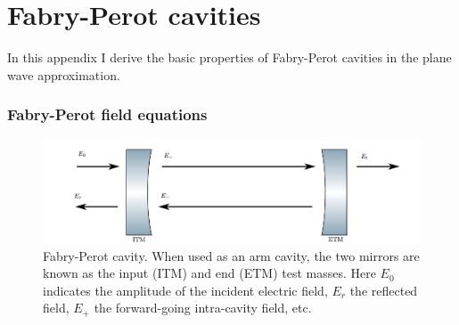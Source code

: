\chapter{Fabry-Perot cavities}
In this appendix I derive the basic properties of Fabry-Perot
cavities in the plane wave approximation.

\subsection{Fabry-Perot field equations}

\begin{figure}
\includegraphics[]{figures/cavity.pdf}
\caption[Fabry-Perot Cavity]{\label{fig:fabry-perot}Fabry-Perot
  cavity.  When used as an arm cavity, the two mirrors are known as
  the input (ITM) and end (ETM) test masses.  Here $E_0$ indicates the
  amplitude of the incident electric field, $E_r$ the reflected field,
  $E_+$ the forward-going intra-cavity field, etc.}
\end{figure}

